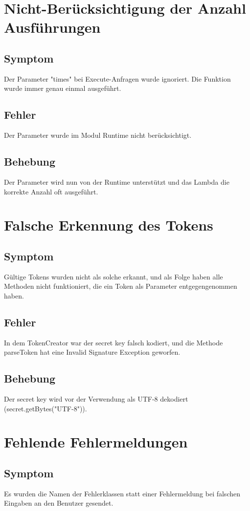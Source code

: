 \documentclass[a4paper,20pt,oneside]{book}
\begin{document}
	\section{Nicht-Berücksichtigung der Anzahl Ausführungen}
	\subsection{Symptom}
	Der Parameter "times" bei Execute-Anfragen wurde ignoriert. Die Funktion wurde immer genau einmal ausgeführt.
	\subsection{Fehler}
	Der Parameter wurde im Modul Runtime nicht berücksichtigt.
	\subsection{Behebung}
	Der Parameter wird nun von der Runtime unterstützt und das Lambda die korrekte Anzahl oft ausgeführt.
	\section{Falsche Erkennung des Tokens}
	\subsection{Symptom}
	Gültige Tokens wurden nicht als solche erkannt, und als Folge haben alle Methoden nicht funktioniert, die ein Token als Parameter entgegengenommen haben.
	\subsection{Fehler}
	In dem TokenCreator war der secret key falsch kodiert, und die Methode parseToken hat eine Invalid Signature Exception geworfen.
	\subsection{Behebung}
	Der secret key wird vor der Verwendung als UTF-8 dekodiert (secret.getBytes("UTF-8")).
	\section{Fehlende Fehlermeldungen}
	\subsection{Symptom}
	Es wurden die Namen der Fehlerklassen statt einer Fehlermeldung bei falschen Eingaben an den Benutzer gesendet.
\end{document}
